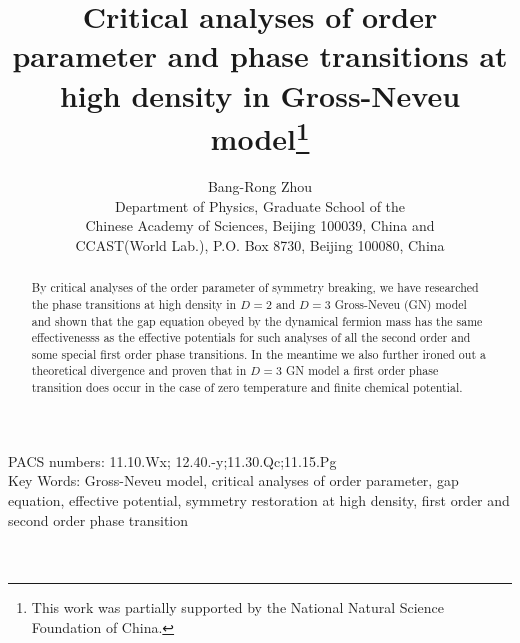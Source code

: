 \documentclass[a4paper,eqsecnum]{revtex4}
\begin{document}
\title{Critical analyses of order parameter and phase transitions at high density 
in Gross-Neveu model\footnote{ This work was partially supported by the National Natural Science Foundation of China.}
\\
}
\author{Bang-Rong Zhou \\
Department of Physics, Graduate School of the \\
Chinese Academy of Sciences, Beijing 100039, China and \\
CCAST(World Lab.), P.O. Box 8730, Beijing 100080, China }
\begin{abstract}
By critical analyses of the order parameter of symmetry breaking, we have researched 
the phase transitions at high density in $D=2$ and $D=3$ Gross-Neveu (GN) model and 
shown that the gap equation obeyed by the dynamical fermion mass has the same 
effectivenesss as the effective potentials for such analyses of all the second order 
and some special first order phase transitions. In the meantime we also further ironed 
out a theoretical divergence and proven that in $D=3$ GN model a first order phase 
transition does occur in the case of zero temperature and finite chemical potential.
\end{abstract}
\maketitle
PACS numbers: 11.10.Wx; 12.40.-y;11.30.Qc;11.15.Pg \\
Key Words: Gross-Neveu model, critical analyses of order parameter,
gap equation, effective potential, symmetry restoration at high density,
 first order and second order phase transition \\ \\ \\
\end{document}
